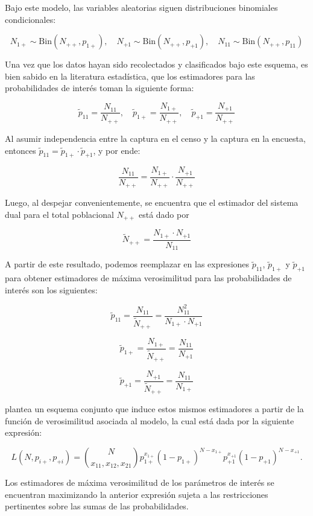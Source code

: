 \documentclass[
  12pt,
]{book}
\begin{document}
Bajo este modelo, las variables aleatorias siguen distribuciones binomiales condicionales:

\[
N_{1+} \sim \text{Bin}(N_{++}, p_{1+}), \quad N_{+1} \sim \text{Bin}(N_{++}, p_{+1}), \quad N_{11} \sim \text{Bin}(N_{++}, p_{11})
\]

Una vez que los datos hayan sido recolectados y clasificados bajo este esquema, es bien sabido en la literatura estadística, que los estimadores para las probabilidades de interés toman la siguiente forma:

\[
\tilde{p}_{11} = \frac{N_{11}}{N_{++}},  \quad 
\tilde{p}_{1+} = \frac{N_{1+}}{N_{++}},  \quad 
\tilde{p}_{+1} = \frac{N_{+1}}{N_{++}}
\]

Al asumir independencia entre la captura en el censo y la captura en la encuesta, entonces \(\tilde{p}_{11} = \tilde{p}_{1+} \cdot \tilde{p}_{+1}\), y por ende:

\[
\frac{N_{11}}{N_{++}} = \frac{N_{1+}}{N_{++}} \cdot \frac{N_{+1}}{N_{++}}
\]

Luego, al despejar convenientemente, se encuentra que el estimador del sistema dual para el total poblacional \(N_{++}\) está dado por

\[
\tilde{N}_{++} = \frac{N_{1+} \cdot N_{+1}}{N_{11}} 
\]

A partir de este resultado, podemos reemplazar en las expresiones \(\tilde{p}_{11}\), \(\tilde{p}_{1+}\) y \(\tilde{p}_{+1}\) para obtener estimadores de máxima verosimilitud para las probabilidades de interés son los siguientes:

\[
\tilde{p}_{11} = \frac{N_{11}}{\tilde{N}_{++}} = \frac{N_{11}^2}{N_{1+} \cdot N_{+1}}
\]

\[
\tilde{p}_{1+} = \frac{N_{1+}}{\tilde{N}_{++}} = \frac{N_{11}}{N_{+1}}
\]

\[
\tilde{p}_{+1} = \frac{N_{+1}}{\tilde{N}_{++}} = \frac{N_{11}}{N_{1+}}
\]

\citet[sección 2.4]{wolter1986coverage} plantea un esquema conjunto que induce estos mismos estimadores a partir de la función de verosimilitud asociada al modelo, la cual está dada por la siguiente expresión:

\[
L(N, p_{i+}, p_{+i}) = \binom{N}{x_{11}, x_{12}, x_{21}} p_{1+}^{x_{1+}} (1 - p_{1+})^{N - x_{1+}} p_{+1}^{x_{+1}} (1 - p_{+1})^{N - x_{+1}}.
\]

Los estimadores de máxima verosimilitud de los parámetros de interés se encuentran maximizando la anterior expresión sujeta a las restricciones pertinentes sobre las sumas de las probabilidades.
\end{document}
